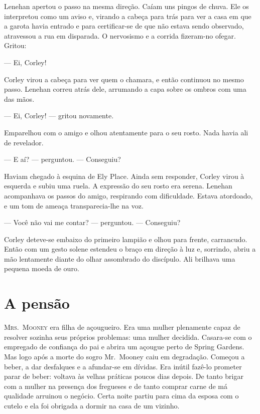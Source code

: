 Lenehan apertou o passo na mesma direção.  Caíam uns pingos de chuva.  Ele os
interpretou como um aviso e, virando a cabeça para trás para ver a casa em que
a garota havia entrado e para certificar-se de que não estava sendo observado,
atravessou a rua em disparada.  O nervosismo e a corrida fizeram-no ofegar.
Gritou:

--- Ei, Corley!

Corley virou a cabeça para ver quem o chamara, e então continuou no mesmo
passo.  Lenehan correu atrás dele, arrumando a capa sobre os ombros com uma das
mãos.

--- Ei, Corley! --- gritou novamente.

Emparelhou com o amigo e olhou atentamente para o seu rosto.  Nada havia ali de
revelador.

--- E aí? --- perguntou.  --- Conseguiu?

Haviam chegado à esquina de Ely Place.  Ainda sem responder, Corley virou à
esquerda e subiu uma ruela.  A expressão do seu rosto era serena.  Lenehan
acompanhava os passos do amigo, respirando com dificuldade.  Estava atordoado,
e um tom de ameaça transparecia-lhe na voz.

--- Você não vai me contar? --- perguntou.  --- Conseguiu?

Corley deteve-se embaixo do primeiro lampião e olhou para frente, carrancudo.
Então com um gesto solene estendeu o braço em direção à luz e, sorrindo, abriu
a mão lentamente diante do olhar assombrado do discípulo.  Ali brilhava uma
pequena moeda de ouro.


\chapter{A pensão}

\textsc{Mrs.~Mooney} era filha de açougueiro.  Era uma mulher plenamente capaz
de resolver sozinha seus próprios problemas: uma mulher decidida.  Casara-se
com o empregado de confiança do pai e abrira um açougue perto de Spring
Gardens.  Mas logo após a morte do sogro Mr.~Mooney caiu em degradação.
Começou a beber, a dar desfalques e a afundar-se em dívidas.  Era inútil
fazê-lo prometer parar de beber: voltava às velhas práticas poucos dias depois.
De tanto brigar com a mulher na presença dos fregueses e de tanto comprar carne
de má qualidade arruinou o negócio.  Certa noite partiu para cima da esposa com
o cutelo e ela foi obrigada a dormir na casa de um vizinho.

